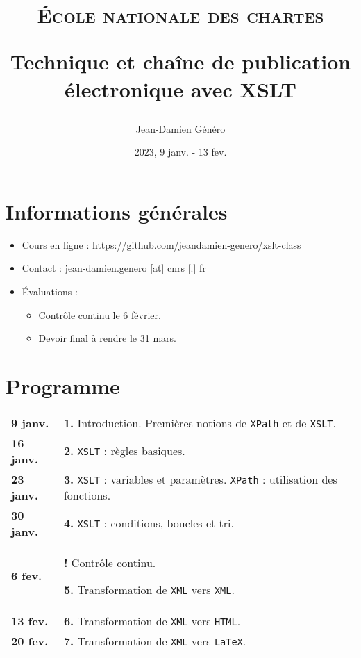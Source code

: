 \documentclass[a4paper]{article}
\title{\textsc{École nationale des chartes}

\bigskip

Technique et chaîne de publication électronique avec XSLT}
\author{Jean-Damien Généro}
\date{2023, 9 janv. - 13 fev.}
\begin{document}
\maketitle

\section*{Informations générales}

\begin{itemize}
    \item Cours en ligne : https://github.com/jeandamien-genero/xslt-class
    \item Contact : jean-damien.genero [at] cnrs [.] fr
    \item Évaluations :
    \begin{itemize}
        \item Contrôle continu le 6 février.
        \item Devoir final à rendre le 31 mars.
    \end{itemize}
\end{itemize}

\bigskip

\section*{Programme}

\renewcommand{\arraystretch}{1.5}
\begin{center}
    \begin{tabular}[h]{|p{1.5cm} p{9.6cm}}
        \textbf{9 janv.} & \textbf{1.} Introduction. Premières notions de \texttt{XPath} et de \texttt{XSLT}.\\
        \textbf{16 janv.} & \textbf{2.} \texttt{XSLT} : règles basiques.  \\
        \textbf{23 janv.} & \textbf{3.} \texttt{XSLT} : variables et paramètres. \texttt{XPath} : utilisation des fonctions. \\
        \textbf{30 janv.} & \textbf{4.} \texttt{XSLT} : conditions,  boucles et tri. \\
        \textbf{6 fev.} & \textbf{!}  Contrôle continu.
        
        \textbf{5.} Transformation de \texttt{XML}  vers \texttt{XML}. \\
        \textbf{13 fev.} & \textbf{6.} Transformation de \texttt{XML}  vers \texttt{HTML}. \\
        \textbf{20 fev.} & \textbf{7.} Transformation de \texttt{XML}  vers \texttt{LaTeX}. \\
    \end{tabular}
\end{center}
\end{document}
